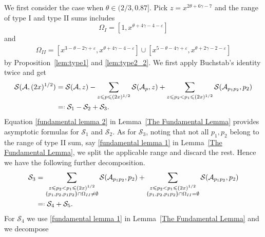 \documentclass[12pt, reqno, twoside, letterpaper]{amsart}
\numberwithin{equation}{section}
\newcommand{\cA}{\ensuremath{\mathcal{A}}}
\newcommand{\cS}{\ensuremath{\mathcal{S}}}
\theoremstyle{customthm}
\theoremstyle{customrem}
\newcommand*{\eqdef}{=\mathrel{\vcenter{\baselineskip0.5ex \lineskiplimit0pt
			\hbox{\scriptsize.}\hbox{\scriptsize.}}}%
}
\begin{document}
We first consider the case when $\theta \in (2/3,0.87]$. Pick $z=x^{2\theta+6\gamma-7}$ and the range of type I and type II sums includes
$$
\Omega_I = [1,x^{\theta+4\gamma-4-\varepsilon}]
$$
and
\begin{align*}
	\Omega_{II} = [x^{3-\theta-2\gamma+\varepsilon},x^{\theta+4\gamma-4-\varepsilon}] \cup [x^{5-\theta-4\gamma+\varepsilon},x^{\theta+2\gamma-2-\varepsilon}] 
\end{align*}
by Proposition~\ref{lem:type1} and \ref{lem:type2_2}. We first apply Buchstab’s identity twice and get
\begin{align}\label{s1s2s3}
\nonumber	\cS(\cA,(2x)^{1/2}) &= \cS(\cA,z) - \sum_{z \leqslant p \leqslant (2x)^{1/2}} \cS(\cA_p,z) + \sum_{z \leqslant p_2 < p_1 \leqslant (2x)^{1/2}} \cS(\cA_{p_1p_2},p_2) \\
	& \eqdef \cS_1 - \cS_2 + \cS_3.
\end{align}
Equation \eqref{fundamental lemma 2} in Lemma~\ref{The Fundamental Lemma} provides asymptotic formulas for $\cS_1$ and $\cS_2$. As for $\cS_3$, noting that not all $p_1, p_2$ belong to the range of type II sum, say \eqref{fundamental lemma 1} in Lemma~\ref{The Fundamental Lemma}, we split the applicable range and discard the rest. Hence we have the following further decomposition.
\begin{align}\label{s4s5}
\nonumber	\cS_3 &= \sum_{\substack{z \leqslant p_2 < p_1 \leqslant (2x)^{1/2} \\ \{p_1,p_2,p_1p_2\} \cap \Omega_{II} \neq \emptyset}} \cS(\cA_{p_1p_2},p_2) + \sum_{\substack{z \leqslant p_2 < p_1 \leqslant (2x)^{1/2} \\ \{p_1,p_2,p_1p_2\} \cap \Omega_{II} =                                                                    \emptyset}} \cS(\cA_{p_1p_2},p_2) \\
	& \eqdef \cS_4 + \cS_5. 
\end{align}
For $\cS_4$ we use \eqref{fundamental lemma 1} in Lemma~\ref{The Fundamental Lemma} and we decompose
\end{document}

